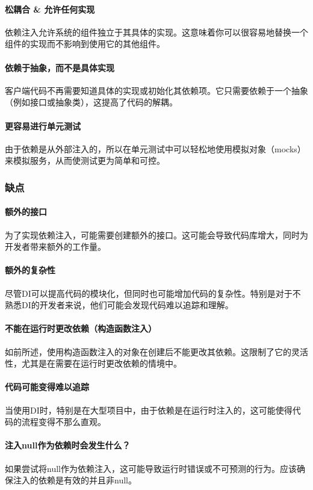 \paragraph{松耦合 \& 允许任何实现}
依赖注入允许系统的组件独立于其具体的实现。这意味着你可以很容易地替换一个组件的实现而不影响到使用它的其他组件。
\paragraph{依赖于抽象，而不是具体实现}
客户端代码不再需要知道具体的实现或初始化其依赖项。它只需要依赖于一个抽象（例如接口或抽象类），这提高了代码的解耦。
\paragraph{更容易进行单元测试}
由于依赖是从外部注入的，所以在单元测试中可以轻松地使用模拟对象（mocks）来模拟服务，从而使测试更为简单和可控。

\subsubsection{缺点}
\paragraph{额外的接口}
为了实现依赖注入，可能需要创建额外的接口。这可能会导致代码库增大，同时为开发者带来额外的工作量。
\paragraph{额外的复杂性}
尽管DI可以提高代码的模块化，但同时也可能增加代码的复杂性。特别是对于不熟悉DI的开发者来说，他们可能会发现代码难以追踪和理解。
\paragraph{不能在运行时更改依赖（构造函数注入）}
如前所述，使用构造函数注入的对象在创建后不能更改其依赖。这限制了它的灵活性，尤其是在需要在运行时更改依赖的情境中。
\paragraph{代码可能变得难以追踪}
当使用DI时，特别是在大型项目中，由于依赖是在运行时注入的，这可能使得代码的流程变得不那么直观。
\paragraph{注入null作为依赖时会发生什么？}
如果尝试将null作为依赖注入，这可能导致运行时错误或不可预测的行为。应该确保注入的依赖是有效的并且非null。

